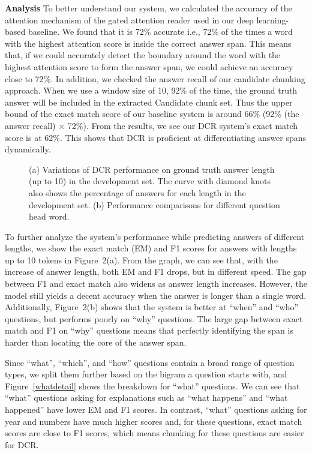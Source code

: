 \documentclass[letterpaper]{article}
\begin{document}
\noindent\textbf{Analysis}
To better understand our system, we calculated the accuracy of the attention mechanism of the gated attention reader used in our deep learning-based baseline. We found that it is 72\% accurate i.e., 72\% of the times a word with the highest attention score is inside the correct answer span. This means that, if we could accurately detect the boundary around the word with the highest attention score to form the answer span, we could achieve an accuracy close to 72\%.
In addition, we checked the answer recall of our candidate chunking approach. When we use a window size of 10, 92\% of the time, the ground truth answer will be included in the extracted Candidate chunk set. 
Thus the upper bound of the exact match score of our baseline system is around 66\% (92\% (the answer recall) $\times$ 72\%). From the results, we see our DCR system's exact match score is at 62\%. This shows that DCR is proficient at differentiating answer spans dynamically.

\begin{figure}
\begin{center}
\caption{(a) Variations of DCR performance on ground truth answer length (up to 10) in the development set. The curve with diamond knots also shows the percentage of answers for each length in the development set. (b) Performance comparisons for different question head word.}
\label{fig_stat}
\end{center}
\end{figure}

To further analyze the system's performance while predicting answers of different lengths, we show the exact match (EM) and F1 scores for answers with lengths up to 10 tokens in Figure~2(a). From the graph, we can see that, with the increase of answer length, both EM and F1 drops, but in different speed. The gap between F1 and exact match also widens as answer length increases. However, the model still yields a decent accuracy when the answer is longer than a single word. Additionally, Figure~2(b) shows that the system is better at ``when'' and ``who'' questions, but performs poorly on ``why'' questions. The large gap between exact match and F1 on ``why'' questions means that perfectly identifying the span is harder than locating the core of the answer span.

Since ``what'', ``which'', and ``how'' questions contain a broad range of question types, we split them further based on the bigram a question starts with, and Figure~\ref{whatdetail} shows the breakdown for ``what'' questions. We can see that ``what'' questions asking for explanations such as ``what happens'' and ``what happened'' have lower EM and F1 scores. In contrast, ``what'' questions asking for year and numbers have much higher scores and, for these questions, exact match scores are close to F1 scores, which means chunking for these questions are easier for DCR.
\end{document}
